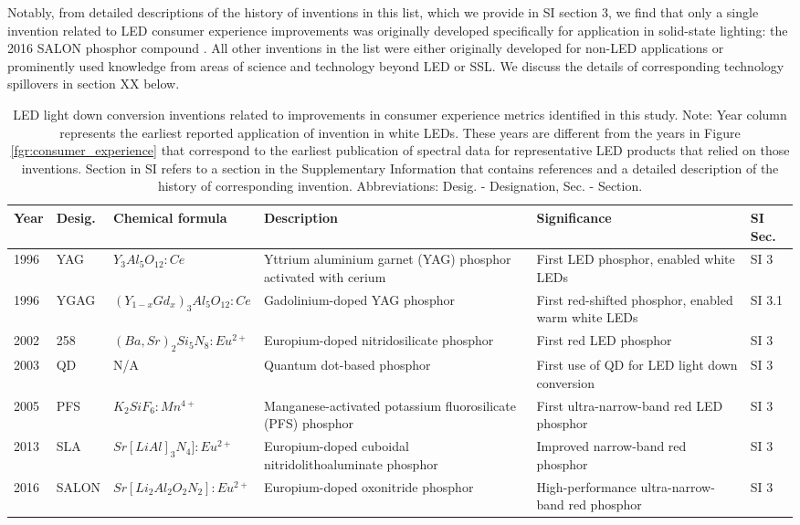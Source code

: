 \documentclass[twoside,twocolumn,9pt]{article}
\begin{document}
Notably, from detailed descriptions of the history of inventions in this list, which we provide in SI section 3, we find that only a single invention related to LED consumer experience improvements was originally developed specifically for application in solid-state lighting: the 2016 SALON phosphor compound \cite{seibald2019phosphor}\cite{Hoerder2019}. All other inventions in the list were either originally developed for non-LED applications or prominently used knowledge from areas of science and technology beyond LED or SSL. We discuss the details of corresponding technology spillovers in section XX below. 

\begin{table}[h!]
    \small
    \centering
    \begin{tabularx}{\textwidth}{|l|l|l|X|X|l|}
    \hline
        \textbf{Year} & \textbf{Desig.} & \textbf{Chemical formula} & \textbf{Description} & \textbf{Significance} & \textbf{SI Sec.} \\ \hline
        1996 & YAG & $Y_3 Al_5 O_{12}:Ce$ & Yttrium aluminium garnet (YAG) phosphor activated with cerium & First LED phosphor, enabled white LEDs & SI 3 \\ \hline
        1996 & YGAG & $(Y_{1-x} Gd_x)_3 Al_5 O_{12}:Ce$ & Gadolinium-doped YAG phosphor & First red-shifted phosphor, enabled warm white LEDs & SI 3.1 \\ \hline
        2002 & 258 & $(Ba,Sr)_2 Si_5 N_8:Eu^{2+}$ & Europium-doped nitridosilicate phosphor & First red LED phosphor & SI 3 \\ \hline
        2003 & QD & N/A & Quantum dot-based phosphor & First use of QD for LED light down conversion & SI 3 \\ \hline
        2005 & PFS & $K_2 SiF_6: Mn^{4+}$ & Manganese-activated potassium fluorosilicate (PFS) phosphor & First ultra-narrow-band red LED phosphor & SI 3 \\ \hline
        2013 & SLA & $Sr[Li Al]_3 N_4 ]:Eu^{2+}$ & Europium-doped cuboidal nitridolithoaluminate phosphor & Improved narrow-band red phosphor & SI 3 \\ \hline
        2016 & SALON & $Sr[Li_2 Al_2 O_2 N_2]:Eu^{2+}$ & Europium-doped oxonitride phosphor & High-performance ultra-narrow-band red phosphor & SI 3 \\ \hline
    \end{tabularx}
    \caption{LED light down conversion inventions related to improvements in consumer experience metrics identified in this study. Note: Year column represents the earliest reported application of invention in white LEDs. These years are different from the years in Figure \ref{fgr:consumer_experience} that correspond to the earliest publication of spectral data for representative LED products  that relied on those inventions. Section in SI refers to a section in the Supplementary Information that contains references and a detailed description of the history of corresponding invention. Abbreviations: Desig. - Designation, Sec. - Section.}
    \label{tab:phosphors}
\end{table}
\end{document}
